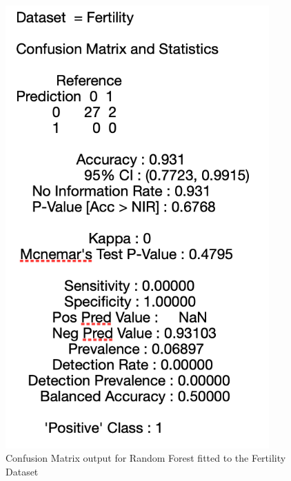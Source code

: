 \begin{figure}[!htbp]
    \centering
    \begin{minipage}{0.45\textwidth}
        \centering
        \includegraphics[width=0.9\textwidth]{ThesisTemplate/appendix/images/Chapter5Appendix/ConfusionMatrix/Fertility.png} 
        \caption{Confusion Matrix output for Random Forest fitted to the Fertility Dataset}
        \label{fig:matrixFert}
    \end{minipage}\hfill
    \begin{minipage}{0.45\textwidth}
        \centering

\end{minipage}
\end{figure}
